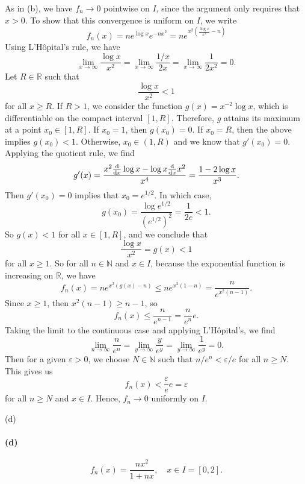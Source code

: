 \documentclass[12pt]{article}
\newenvironment{fullbox}{\begin{lrbox}{\savefullbox}\begin{minipage}{\dimexpr\textwidth-2\fboxsep\relax}}{\end{minipage}\end{lrbox}\begin{center}\framebox[\textwidth]{\usebox{\savefullbox}}\end{center}}
\newenvironment{pbox}[1][]{\begin{fullbox}\ifx#1\empty\else\paragraph{#1}\fi}{\end{fullbox}}
\theoremstyle{definition}
\newcommand{\N}{\mathbb{N}}
\newcommand{\R}{\mathbb{R}}
\newcommand{\eps}{\varepsilon}
\begin{document}
As in (b), we have $f_n \to 0$ pointwise on $I$, since the argument only requires that $x > 0$. To show that this convergence is uniform on $I$, we write
\[
    f_n(x)
        = ne^{\log x}e^{-nx^2}
        = ne^{x^2\left(\frac{\log x}{x^2} - n\right)}
\]
Using L'H\^opital's rule, we have
\[
    \lim_{x \to \infty} \frac{\log x}{x^2}
        = \lim_{x \to \infty} \frac{1/x}{2x}
        = \lim_{x \to \infty} \frac{1}{2x^2}
        = 0.
\]
Let $R \in \R$ such that
\[
    \frac{\log x}{x^2} < 1
\]
for all $x \geq R$. If $R > 1$, we consider the function $g(x) = x^{-2} \log x$, which is differentiable on the compact interval $[1, R]$. Therefore, $g$ attains its maximum at a point $x_0 \in [1, R]$. If $x_0 = 1$, then $g(x_0) = 0$. If $x_0 = R$, then the above implies $g(x_0) < 1$. Otherwise, $x_0 \in (1, R)$ and we know that $g'(x_0) = 0$. Applying the quotient rule, we find
\[
    g'(x)
        = \frac{x^2 \dv{x} \log x - \log x \dv{x} x^2}{x^4}
        = \frac{1 - 2\log x}{x^3}.
\]
Then $g'(x_0) = 0$ implies that $x_0 = e^{1/2}$. In which case,
\[
    g(x_0)
        = \frac{\log e^{1/2}}{(e^{1/2})^2}
        = \frac{1}{2e}
        < 1.
\]
So $g(x) < 1$ for all $x \in [1, R]$, and we conclude that
\[
    \frac{\log x}{x^2} = g(x) < 1
\]
for all $x \geq 1$. So for all $n \in \N$ and $x \in I$, because the exponential function is increasing on $\R$, we have
\[
    f_n(x)
        = ne^{x^2\left(g(x) - n\right)}
        \leq ne^{x^2(1 - n)}
        = \frac{n}{e^{x^2(n-1)}}.
\]
Since $x \geq 1$, then $x^2(n-1) \geq n-1$, so
\[
    f_n(x)
        \leq \frac{n}{e^{n-1}}
        = \frac{n}{e^n}e.
\]
Taking the limit to the continuous case and applying L'H\^opital's, we find
\[
    \lim_{n \to \infty} \frac{n}{e^n}
        = \lim_{y \to \infty} \frac{y}{e^y}
        = \lim_{y \to \infty} \frac{1}{e^y}
        = 0.
\]
Then for a given $\eps > 0$, we choose $N \in \N$ such that $n/e^n < \eps/e$ for all $n \geq N$. This gives us
\[
    f_n(x) < \frac{\eps}{e} e = \eps
\]
for all $n \geq N$ and $x \in I$. Hence, $f_n \to 0$ uniformly on $I$.



\begin{pbox}[(d)]
    \begin{equation}
    f_n(x) = \frac{nx^2}{1+nx},\quad x\in I=[0,2].
    \end{equation}
\end{pbox}
\end{document}
